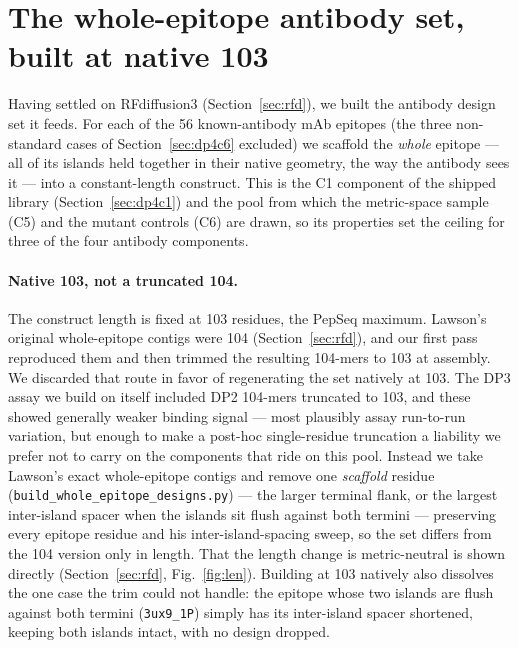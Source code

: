 \section{The whole-epitope antibody set, built at native 103}\label{sec:c1set}
Having settled on RFdiffusion3 (Section~\ref{sec:rfd}), we built the antibody design set it feeds. For
each of the \num{56} known-antibody mAb epitopes (the three non-standard cases of
Section~\ref{sec:dp4c6} excluded) we scaffold the \emph{whole} epitope --- all of its islands held
together in their native geometry, the way the antibody sees it --- into a constant-length construct.
This is the C1 component of the shipped library (Section~\ref{sec:dp4c1}) and the pool from which the
metric-space sample (C5) and the mutant controls (C6) are drawn, so its properties set the ceiling for
three of the four antibody components.

\paragraph{Native 103, not a truncated 104.} The construct length is fixed at \num{103} residues, the
PepSeq maximum. Lawson's original whole-epitope contigs were \num{104} (Section~\ref{sec:rfd}), and our
first pass reproduced them and then trimmed the resulting \num{104}-mers to \num{103} at assembly. We
discarded that route in favor of regenerating the set natively at \num{103}. The DP3 assay we build on
itself included DP2 \num{104}-mers truncated to \num{103}, and these showed generally weaker binding
signal --- most plausibly assay run-to-run variation, but enough to make a post-hoc single-residue
truncation a liability we prefer not to carry on the components that ride on this pool. Instead we take
Lawson's exact whole-epitope contigs and remove one \emph{scaffold} residue
(\texttt{build\_whole\_epitope\_designs.py}) --- the larger terminal flank, or the largest inter-island
spacer when the islands sit flush against both termini --- preserving every epitope residue and his
inter-island-spacing sweep, so the set differs from the \num{104} version only in length. That the
length change is metric-neutral is shown directly (Section~\ref{sec:rfd}, Fig.~\ref{fig:len}). Building
at \num{103} natively also dissolves the one case the trim could not handle: the epitope whose two
islands are flush against both termini (\texttt{3ux9\_1P}) simply has its inter-island spacer shortened,
keeping both islands intact, with no design dropped.

